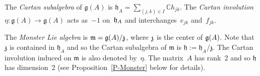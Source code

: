 \documentclass[11pt,letterpaper]{amsart}
\numberwithin{thecounter}{section}
\theoremstyle{definition}
\newcommand{\C}{{\mathbb C}}
\newcommand{\nm}{{\mathfrak{n}^-}}
\begin{document}
The \emph{Cartan subalgebra} of $\mathfrak{g}(A)$ is $\mathfrak{h}_{A}=\sum_{(j,k)\in I} \C h_{jk}$.
The \emph{Cartan involution} $\eta:\mathfrak{g}(A)\to\mathfrak{g}(A)$  acts as~$-1$ on~$\frak h_A$ and interchanges~$e_{jk}$ and~$f_{jk}$. 

The \emph{Monster Lie algebra} is  $\mathfrak{m}=\mathfrak{g}(A)/\frak{z}$, where $\frak z$ is the center of $\frak g(A)$.
Note that $\mathfrak{z}$ is contained in $\mathfrak{h}_A$ and so the Cartan subalgebra of $\mathfrak{m}$ is 
$ \mathfrak{h}:= \mathfrak{h}_A/\mathfrak{z}$.
The Cartan involution induced on $\mathfrak{m}$ is also denoted by~$\eta$. 
The matrix~$A$ has rank~2 and so $\mathfrak{h}$ has dimension~2 (see Proposition~\ref{P-Monster} below for details).
\end{document}
